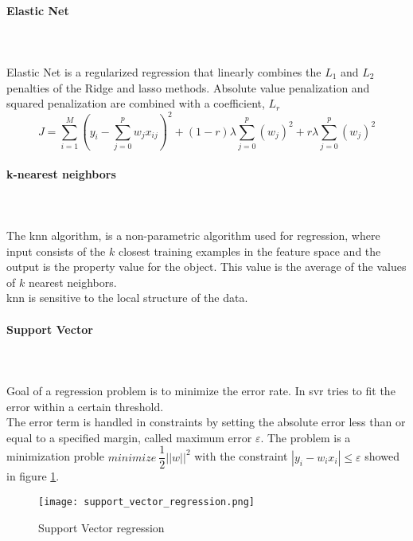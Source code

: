 \paragraph{Elastic Net}
\mbox{} \\ \\
Elastic Net is a regularized regression that linearly combines the $L_1$ and $L_2$ penalties of the Ridge and \gls{lasso} methods. Absolute value penalization and squared penalization are combined with a coefficient, $L_{r}$
\begin{equation}
	J=\sum_{i=1}^{M}{{ \left( y_i-\sum_{j=0}^{p}{w_jx_{ij}} \right) }^2}+(1-r) \lambda \sum_{j=0}^{p}{{(w_j)}^2}+r \lambda \sum_{j=0}^{p}{{(w_j)}^2}
\end{equation}\label{elasticnet_eq}

\paragraph{k-nearest neighbors}
\mbox{} \\ \\
The \gls{knn} algorithm, is a non-parametric algorithm used for regression, where input consists of the $k$ closest training examples in the feature space and the output is the property value for the object. This value is the average of the values of $k$ nearest neighbors.
\\
\gls{knn} is sensitive to the local structure of the data.

\paragraph{Support Vector}
\mbox{} \\ \\
Goal of a regression problem is to minimize the error rate. In \gls{svr} tries to fit the error within a certain threshold.
\\
The error term is handled in constraints by setting the absolute error less than or equal to a specified margin, called maximum error $\varepsilon$. The problem is a minimization proble $minimize \: \dfrac{1}{2}||w||^2$ with the constraint $|y_i-w_ix_i| \leq \varepsilon$ showed in figure \ref{fig:support_vector_regression}.
\begin{figure}[h]
    \centering
    \texttt{[image: support\_vector\_regression.png]} 
	\caption{Support Vector regression}
    \label{fig:support_vector_regression}
\end{figure} 

